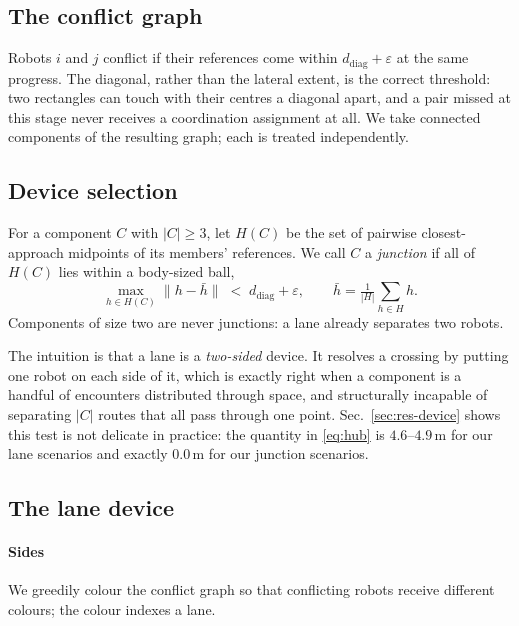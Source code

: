 \documentclass[conference]{IEEEtran}
\begin{document}
\subsection{The conflict graph}

Robots $i$ and $j$ conflict if their references come within
$d_{\mathrm{diag}} + \varepsilon$ at the same progress. The diagonal, rather than the
lateral extent, is the correct threshold: two rectangles can touch with their centres a
diagonal apart, and a pair missed at this stage never receives a coordination assignment at
all. We take connected components of the resulting graph; each is treated independently.

\subsection{Device selection}
\label{sec:device}

For a component $C$ with $|C| \ge 3$, let $H(C)$ be the set of pairwise closest-approach
midpoints of its members' references. We call $C$ a \emph{junction} if all of $H(C)$ lies
within a body-sized ball,
\begin{equation}
\max_{h \in H(C)} \| h - \bar{h} \| \;<\; d_{\mathrm{diag}} + \varepsilon ,
\qquad \bar{h} = \tfrac{1}{|H|}\textstyle\sum_{h \in H} h .
\label{eq:hub}
\end{equation}
Components of size two are never junctions: a lane already separates two robots.

The intuition is that a lane is a \emph{two-sided} device. It resolves a crossing by
putting one robot on each side of it, which is exactly right when a component is a handful
of encounters distributed through space, and structurally incapable of separating $|C|$
routes that all pass through one point. Sec.~\ref{sec:res-device} shows this test is not
delicate in practice: the quantity in \eqref{eq:hub} is $4.6$--$4.9$\,m for our lane
scenarios and exactly $0.0$\,m for our junction scenarios.

\subsection{The lane device}
\label{sec:lane}

\paragraph{Sides} We greedily colour the conflict graph so that conflicting robots receive
different colours; the colour indexes a lane.
\end{document}
